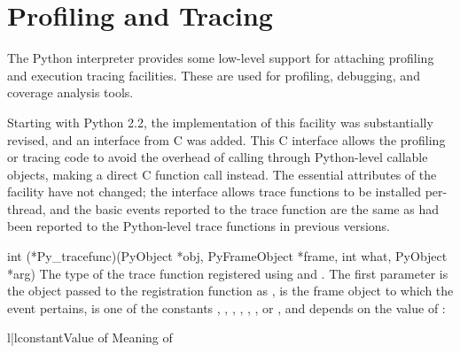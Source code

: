 \section{Profiling and Tracing \label{profiling}}


The Python interpreter provides some low-level support for attaching
profiling and execution tracing facilities.  These are used for
profiling, debugging, and coverage analysis tools.

Starting with Python 2.2, the implementation of this facility was
substantially revised, and an interface from C was added.  This C
interface allows the profiling or tracing code to avoid the overhead
of calling through Python-level callable objects, making a direct C
function call instead.  The essential attributes of the facility have
not changed; the interface allows trace functions to be installed
per-thread, and the basic events reported to the trace function are
the same as had been reported to the Python-level trace functions in
previous versions.

\begin{ctypedesc}[Py_tracefunc]{int (*Py_tracefunc)(PyObject *obj,
                                PyFrameObject *frame, int what,
                                PyObject *arg)}
  The type of the trace function registered using
   and .
  The first parameter is the object passed to the registration
  function as ,  is the frame object to which the
  event pertains,  is one of the constants
  , ,
  , ,
  , ,
  or , and 
  depends on the value of :

  \begin{tableii}{l|l}{constant}{Value of }{Meaning of }
  \end{tableii}
\end{ctypedesc}


